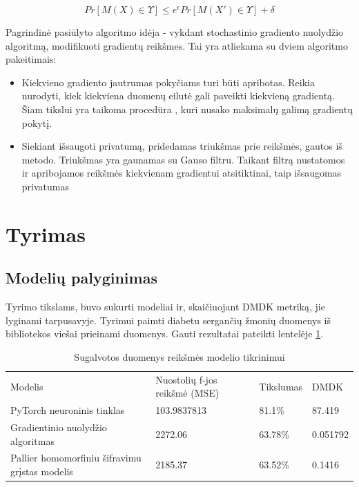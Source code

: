 \documentclass{VUMIFInfBakalaurinis}
\begin{document}
\begin{equation}
    Pr[M(X) \in \Upsilon] \leq e^{\epsilon} Pr[M(X') \in \Upsilon] + \delta
    \label{eq:Diferencinio privaluto sąlyga}
\end{equation}

\par Pagrindinė pasiūlyto algoritmo idėja - vykdant stochastinio gradiento nuolydžio algoritmą, modifikuoti gradientų reikšmes. Tai yra atliekama su dviem algoritmo pakeitimais:

\begin{itemize}
    \item Kiekvieno gradiento jautrumas pokyčiams turi būti apribotas. Reikia nurodyti, kiek kiekviena duomenų eilutė gali paveikti kiekvieną gradientą. Šiam tikslui yra taikoma procedūra , kuri nusako maksimalų galimą gradientų pokytį.
    \item Siekiant išsaugoti privatumą, pridedamas triukšmas prie reikšmės, gautos iš  metodo. Triukšmas yra gaunamas su Gauso filtru. Taikant filtrą nustatomos ir apribojamos reikšmės kiekvienam gradientui atsitiktinai, taip išsaugomas privatumas
\end{itemize}

\section{Tyrimas}
\subsection{Modelių palyginimas}

\par Tyrimo tikslams, buvo sukurti modeliai ir, skaičiuojant DMDK metriką, jie lyginami tarpusavyje. Tyrimui paimti diabetu sergančių žmonių duomenys iš  bibliotekos viešai prieinami duomenys. Gauti rezultatai pateikti lentelėje \ref{tab:DMDK rezultatai}.

\begin{table}[h]
\begin{adjustbox}{width=\textwidth,center=\textwidth}
\begin{tabular}{|l|l|l|l|}
\cline{1-4}
Modelis & Nuostolių f-jos reikšmė (MSE) & Tikslumas & DMDK  \\\cline{1-4}
PyTorch neuroninis tinklas & 103.9837813 & 81.1\% & 87.419  \\\cline{1-4}
Gradientinio nuolydžio algoritmas & 2272.06 & 63.78\% & 0.051792 \\\cline{1-4}
Pallier homomorfiniu šifravimu grįstas modelis & 2185.37 & 63.52\% & 0.1416 \\\cline{1-4}
\end{tabular}
\end{adjustbox}
\caption{Sugalvotos duomenys reikšmės modelio tikrinimui}
\label{tab:DMDK rezultatai}
\end{table}
\end{document}

